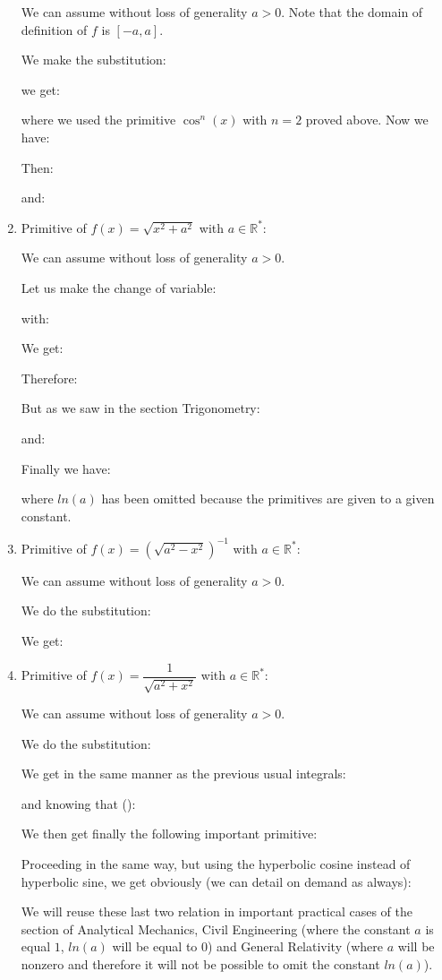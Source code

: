 \begin{enumerate}
		We can assume without loss of generality $a>0$. Note that the domain of definition of $f$ is $[-a, a]$.
		
		We make the substitution:
		
		we get:
		
		where we used the primitive $\cos^n (x)$ with $n=2$ proved above. Now we have:
		
		Then:
		
		and:
		

		\item Primitive of $f(x)=\sqrt{x^2+a^2}$ with $a\in \mathbb{R}^*$:
		
		We can assume without loss of generality $a>0$.
		
		Let us make the change of variable:
		
		with:
		
		We get:
		
		Therefore:
		
		But as we saw in the section Trigonometry:
		
		and:
		
		Finally we have:
		
		where $ln (a)$ has been omitted because the primitives are given to a given constant.
		
		\item Primitive of $f(x)=\left(\sqrt{a^2-x^2}\right)^{-1}$ with $a\in \mathbb{R}^*$:
		
		We can assume without loss of generality $a>0$.
		
		We do the substitution:
		
		We get:
		
		
		\item Primitive of $f(x)=\dfrac{1}{\sqrt{a^2+x^2}}$ with $a\in \mathbb{R}^*$:
		
		We can assume without loss of generality $a>0$.
		
		We do the substitution:
		
		We get in the same manner as the previous usual integrals:
		
		and knowing that ():
		
		We then get finally the following important primitive:
		
		Proceeding in the same way, but using the hyperbolic cosine instead of hyperbolic sine, we get obviously (we can detail on demand as always):
		
		We will reuse these last two relation in important practical cases of the section of Analytical Mechanics, Civil Engineering (where the constant $a$ is equal $1$, $ln (a)$ will be equal to $0$) and General Relativity (where $a$ will be nonzero and therefore it will not be possible to omit the constant $ln (a)$).
		

\end{enumerate}
